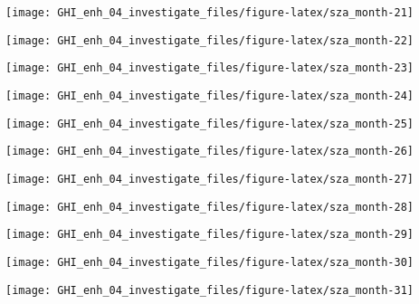 \documentclass[
  10pt,
  a4paper,oneside]{article}
\begin{document}
\begin{center}\texttt{[image: GHI\_enh\_04\_investigate\_files/figure-latex/sza\_month-21]} \end{center}

\begin{center}\texttt{[image: GHI\_enh\_04\_investigate\_files/figure-latex/sza\_month-22]} \end{center}

\begin{center}\texttt{[image: GHI\_enh\_04\_investigate\_files/figure-latex/sza\_month-23]} \end{center}

\begin{center}\texttt{[image: GHI\_enh\_04\_investigate\_files/figure-latex/sza\_month-24]} \end{center}

\begin{center}\texttt{[image: GHI\_enh\_04\_investigate\_files/figure-latex/sza\_month-25]} \end{center}

\begin{center}\texttt{[image: GHI\_enh\_04\_investigate\_files/figure-latex/sza\_month-26]} \end{center}

\begin{center}\texttt{[image: GHI\_enh\_04\_investigate\_files/figure-latex/sza\_month-27]} \end{center}

\begin{center}\texttt{[image: GHI\_enh\_04\_investigate\_files/figure-latex/sza\_month-28]} \end{center}

\begin{center}\texttt{[image: GHI\_enh\_04\_investigate\_files/figure-latex/sza\_month-29]} \end{center}

\begin{center}\texttt{[image: GHI\_enh\_04\_investigate\_files/figure-latex/sza\_month-30]} \end{center}

\begin{center}\texttt{[image: GHI\_enh\_04\_investigate\_files/figure-latex/sza\_month-31]} \end{center}
\end{document}

